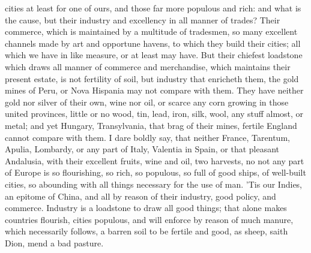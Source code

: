cities at least for one of ours, and those far more populous and rich:
and what is the cause, but their industry and excellency in all manner
of trades? Their commerce, which is maintained by a multitude of
tradesmen, so many excellent channels made by art and opportune havens,
to which they build their cities; all which we have in like measure, or
at least may have. But their chiefest loadstone which draws all manner
of commerce and merchandise, which maintains their present estate, is
not fertility of soil, but industry that enricheth them, the gold mines
of Peru, or Nova Hispania may not compare with them. They have neither
gold nor silver of their own, wine nor oil, or scarce any corn growing
in those united provinces, little or no wood, tin, lead, iron, silk,
wool, any stuff almost, or metal; and yet Hungary, Transylvania, that
brag of their mines, fertile England cannot compare with them. I dare
boldly say, that neither France, Tarentum, Apulia, Lombardy, or any
part of Italy, Valentia in Spain, or that pleasant Andalusia, with
their excellent fruits, wine and oil, two harvests, no not any part of
Europe is so flourishing, so rich, so populous, so full of good ships,
of well-built cities, so abounding with all things necessary for the
use of man. 'Tis our Indies, an epitome of China, and all by reason of
their industry, good policy, and commerce. Industry is a loadstone to
draw all good things; that alone makes countries flourish, cities
populous, and will enforce by reason of much manure, which
necessarily follows, a barren soil to be fertile and good, as sheep,
saith Dion, mend a bad pasture.

